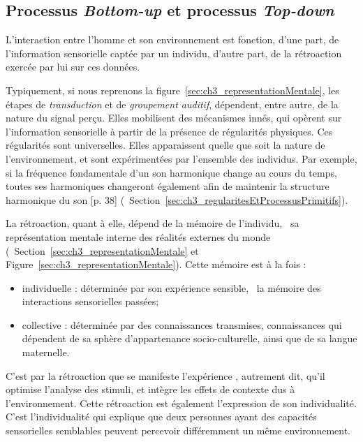 \subsection{Processus \emph{Bottom-up} et processus \emph{Top-down}}
\label{sec:ch3_butd}

L'interaction entre l'homme et son environnement est fonction, d'une part, de l'information sensorielle captée par un individu, d'autre part, de la rétroaction exercée par lui sur ces données. 

Typiquement, si nous reprenons la figure~\ref{sec:ch3_representationMentale}, les étapes de \emph{transduction} et de \emph{groupement auditif}, dépendent, entre autre, de la nature du signal perçu. Elles mobilisent des mécanismes innés, qui opèrent sur l'information sensorielle à partir de la présence de régularités physiques. Ces régularités sont universelles. Elles apparaissent quelle que soit la nature de l'environnement, et sont expérimentées par l'ensemble des individus. Par exemple, si la fréquence fondamentale d'un son harmonique change au cours du temps, toutes ses harmoniques changeront également afin de maintenir la structure harmonique du son [p. 38]\citep{bregman1994auditory} (\cf~Section~\ref{sec:ch3_regularitesEtProcessusPrimitifs}).

La rétroaction, quant à elle, dépend de la mémoire de l'individu, \ie~sa représentation mentale interne des réalités externes du monde (\cf~Section~\ref{sec:ch3_representationMentale} et Figure~\ref{sec:ch3_representationMentale}). Cette mémoire est à la fois :

\begin{itemize}
\item individuelle : déterminée par son expérience sensible, \ie~la mémoire des interactions sensorielles passées;
\item collective : déterminée par des connaissances transmises, connaissances qui dépendent de sa sphère d'appartenance socio-culturelle, ainsi que de sa langue maternelle.
\end{itemize}

C'est par la rétroaction que se manifeste l'expérience  , autrement dit, qu'il optimise l'analyse des stimuli, et intègre les effets de contexte dus à l'environnement. Cette rétroaction est également l'expression de son individualité. C'est l'individualité qui explique que deux personnes ayant des capacités sensorielles semblables peuvent percevoir différemment un même environnement.

